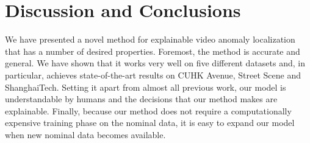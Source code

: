 \section{Discussion and Conclusions}
\label{sec:discuss}

We have presented a novel method for explainable video anomaly localization that has a number of desired properties.  Foremost, the method is accurate and general.  We have shown that it works very well on five different datasets and, in particular, achieves state-of-the-art results on CUHK Avenue, Street Scene and ShanghaiTech.  Setting it apart from almost all previous work, our model is understandable by humans and the decisions that our method makes are explainable.
Finally, because our method does not require a computationally expensive training phase on the nominal data, it is  easy to expand our model when new nominal data becomes available.



